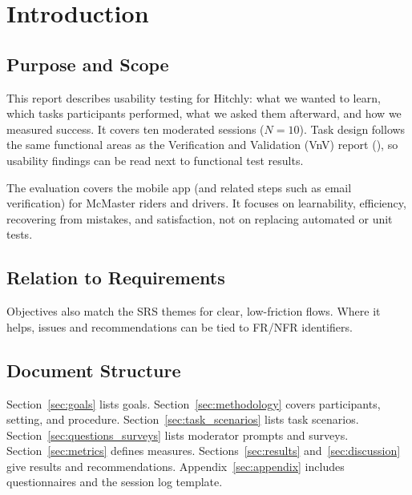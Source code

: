 \section{Introduction}

\subsection{Purpose and Scope}

This report describes usability testing for Hitchly: what we wanted to learn, which tasks participants performed, what we asked them afterward, and how we measured success. It covers ten moderated sessions ($N=10$). Task design follows the same functional areas as the Verification and Validation (VnV) report (), so usability findings can be read next to functional test results.

The evaluation covers the mobile app (and related steps such as email verification) for McMaster riders and drivers. It focuses on learnability, efficiency, recovering from mistakes, and satisfaction, not on replacing automated or unit tests.

\subsection{Relation to Requirements}

Objectives also match the SRS themes for clear, low-friction flows. Where it helps, issues and recommendations can be tied to FR/NFR identifiers.

\subsection{Document Structure}

Section~\ref{sec:goals} lists goals. Section~\ref{sec:methodology} covers participants, setting, and procedure. Section~\ref{sec:task_scenarios} lists task scenarios. Section~\ref{sec:questions_surveys} lists moderator prompts and surveys. Section~\ref{sec:metrics} defines measures. Sections~\ref{sec:results} and~\ref{sec:discussion} give results and recommendations. Appendix~\ref{sec:appendix} includes questionnaires and the session log template.

